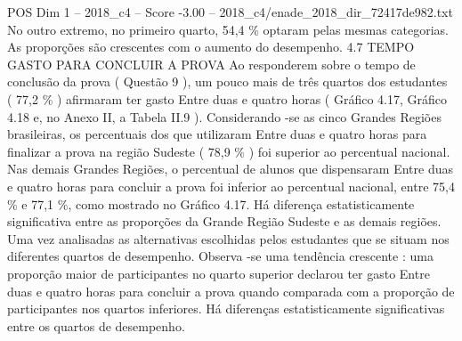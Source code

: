 \begin{textsample}{POS Dim 1 – 2018\_c4 – Score -3.00 – 2018\_c4/enade\_2018\_dir\_72417de982.txt}
No outro extremo, no primeiro quarto, 54,4 \% optaram pelas mesmas categorias.
As proporções são crescentes com o aumento do desempenho. 4.7 TEMPO GASTO PARA CONCLUIR A PROVA Ao responderem sobre o tempo de conclusão da prova ( Questão 9 ), um pouco mais de três quartos dos estudantes ( 77,2 \% ) afirmaram ter gasto Entre duas e quatro horas ( Gráfico 4.17, Gráfico 4.18 e, no Anexo II, a Tabela II.9 ).
Considerando -se as cinco Grandes Regiões brasileiras, os percentuais dos que utilizaram Entre duas e quatro horas para finalizar a prova na região Sudeste ( 78,9 \% ) foi superior ao percentual nacional.
Nas demais Grandes Regiões, o percentual de alunos que dispensaram Entre duas e quatro horas para concluir a prova foi inferior ao percentual nacional, entre 75,4 \% e 77,1 \%, como mostrado no Gráfico 4.17.
Há diferença estatisticamente significativa entre as proporções da Grande Região Sudeste e as demais regiões.
Uma vez analisadas as alternativas escolhidas pelos estudantes que se situam nos diferentes quartos de desempenho.
Observa -se uma tendência crescente : uma proporção maior de participantes no quarto superior declarou ter gasto Entre duas e quatro horas para concluir a prova quando comparada com a proporção de participantes nos quartos inferiores.
Há diferenças estatisticamente significativas entre os quartos de desempenho.

\end{textsample}
